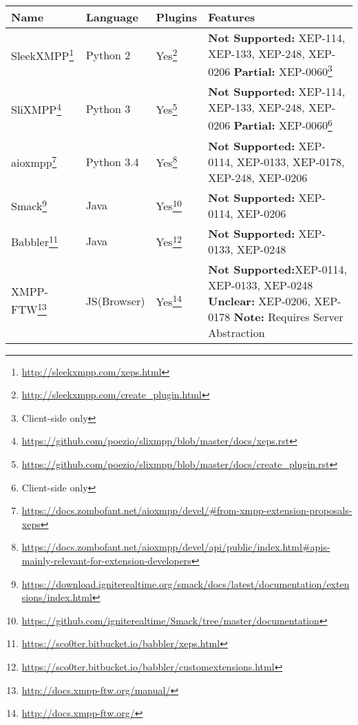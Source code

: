 \begin{tabu}{l|l l X}
    \hline
    Name
    & Language
    & Plugins
    & Features
    \\ \hline

    SleekXMPP\footnote{\url{http://sleekxmpp.com/xeps.html}}
    & Python 2
    & Yes\footnote{\url{http://sleekxmpp.com/create_plugin.html}}
    & \textbf{Not Supported:} XEP-114, XEP-133, XEP-248, XEP-0206\newline
    \textbf{Partial:} XEP-0060\footnote{Client-side only}
    \\

    SliXMPP\footnote{\url{https://github.com/poezio/slixmpp/blob/master/docs/xeps.rst}}
    & Python 3
    & Yes\footnote{\url{https://github.com/poezio/slixmpp/blob/master/docs/create_plugin.rst}}
    & \textbf{Not Supported:} XEP-114, XEP-133, XEP-248, XEP-0206\newline
    \textbf{Partial:} XEP-0060\footnote{Client-side only}
    \\

    aioxmpp\footnote{\url{https://docs.zombofant.net/aioxmpp/devel/\#from-xmpp-extension-proposals-xeps}}
    & Python 3.4
    & Yes\footnote{\url{https://docs.zombofant.net/aioxmpp/devel/api/public/index.html\#apis-mainly-relevant-for-extension-developers}}
    & \textbf{Not Supported:} XEP-0114, XEP-0133, XEP-0178, XEP-248, XEP-0206
    \\

    Smack\footnote{\url{https://download.igniterealtime.org/smack/docs/latest/documentation/extensions/index.html}}
    & Java
    & Yes\footnote{\url{https://github.com/igniterealtime/Smack/tree/master/documentation}}
    & \textbf{Not Supported:} XEP-0114, XEP-0206
    \\

    Babbler\footnote{\url{https://sco0ter.bitbucket.io/babbler/xeps.html}}
    & Java
    & Yes\footnote{\url{https://sco0ter.bitbucket.io/babbler/customextensions.html}}
    & \textbf{Not Supported:} XEP-0133, XEP-0248
    \\

    XMPP-FTW\footnote{\url{http://docs.xmpp-ftw.org/manual/}}
    & JS(Browser)
    & Yes\footnote{\url{http://docs.xmpp-ftw.org/}}
    & \textbf{Not Supported:}\newline XEP-0114, XEP-0133, XEP-0248\newline
    \textbf{Unclear:} XEP-0206, XEP-0178\newline
    \textbf{Note:} Requires Server Abstraction
    \\


\end{tabu}
